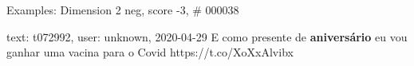\begin{frame}{Examples: Dimension 2 neg, score -3, \# 000038}
\footnotesize
\begin{alertblock}{text: t072992, user: unknown, 2020-04-29}
E como presente de \textbf{aniversário} eu vou ganhar uma vacina para o Covid 
 https://t.co/XoXxAlvibx 
\end{alertblock}
\end{frame}
